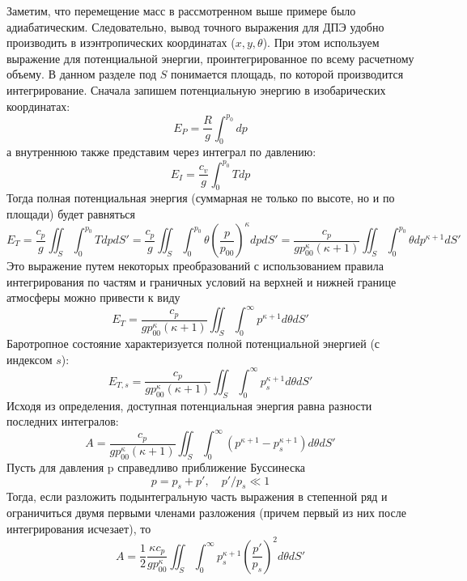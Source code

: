 \documentclass[12pt,a4paper]{report}
\begin{document}
Заметим, что перемещение масс в рассмотренном выше примере было адиабатическим. Следовательно, вывод точного выражения для ДПЭ удобно производить в изэнтропических координатах ($x,y,\theta$). При этом используем выражение для  потенциальной энергии, проинтегрированное по всему расчетному объему. В данном разделе под $S$ понимается площадь, по которой производится интегрирование. Сначала запишем потенциальную энергию в изобарических координатах:
\begin{equation}
E_P=\frac{R}{g}\int_0^{p_0}dp
\end{equation}
а внутреннюю также представим через интеграл по давлению:
\begin{equation}
E_I=\frac{c_v}{g}\int_0^{p_0}Tdp
\end{equation}
Тогда полная потенциальная энергия (суммарная не только по высоте, но и по площади) будет равняться
\begin{equation}
E_T=\frac{c_p}{g}\iint_S\int_0^{p_0}TdpdS' = \frac{c_p}{g}\iint_S\int_0^{p_0}\theta\left(\frac{p}{p_{00}}\right)^\kappa dpdS' = \frac{c_p}{gp_{00}^\kappa (\kappa+1)}\iint_S\int_0^{p_0}\theta dp^{\kappa+1}dS'
\end{equation}
Это выражение путем некоторых преобразований с использованием правила интегрирования по частям и граничных условий на верхней и нижней границе атмосферы можно привести к виду
\begin{equation}
E_T=\frac{c_p}{gp_{00}^\kappa (\kappa+1)}\iint_S\int_0^{\infty}p^{\kappa+1}d\theta dS'
\end{equation}
Баротропное состояние характеризуется полной потенциальной энергией (с индексом $s$):
\begin{equation}
E_{T,s}=\frac{c_p}{gp_{00}^\kappa (\kappa+1)}\iint_S\int_0^{\infty}p_s^{\kappa+1}d\theta dS'
\end{equation}
Исходя из определения, доступная потенциальная энергия равна разности последних интегралов:
\begin{equation}
A=\frac{c_p}{gp_{00}^\kappa (\kappa+1)}\iint_S\int_0^{\infty}\left(p^{\kappa+1} - p_s^{\kappa+1}\right)d\theta dS'
\end{equation}
Пусть для давления p справедливо приближение Буссинеска
\begin{equation}
p=p_s+p', \quad p'/p_s \ll 1
\end{equation}
Тогда, если разложить подынтегральную часть выражения в степенной ряд и ограничиться двумя первыми членами разложения (причем первый из них после интегрирования исчезает), то
\begin{equation}
A=\frac{1}{2}\frac{\kappa c_p}{gp_{00}^\kappa}\iint_S\int_0^{\infty}p_s^{\kappa+1}\left(\frac{p'}{p_s}\right)^2 d\theta dS'
\end{equation}
\end{document}
